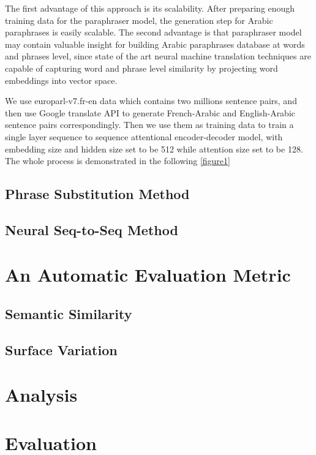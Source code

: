 \documentclass[11pt,letterpaper]{article}
\begin{document}
	The first advantage of this approach is its scalability. After preparing enough training data for the paraphraser model, the generation step for Arabic paraphrases is easily scalable. The second advantage is that paraphraser model may contain valuable insight for  building Arabic paraphrases database at  words and phrases level, since state of the art neural machine translation techniques are capable of capturing word and phrase level similarity by projecting word embeddings into vector space.
	
	We use europarl-v7.fr-en data which contains two millions sentence pairs, and then use Google translate API to generate French-Arabic and English-Arabic sentence pairs correspondingly. Then we use them as training data to train a single layer sequence to sequence attentional encoder-decoder model, with embedding size and hidden size set to be 512 while attention size set to be 128. The whole process is demonstrated in the following  \ref{figure1}

\subsection{Phrase Substitution Method}
\subsection{Neural Seq-to-Seq Method}

\section{An Automatic Evaluation Metric}
\subsection{Semantic Similarity}
\subsection{Surface Variation}

\section{Analysis}

\section{Evaluation}
\end{document}
